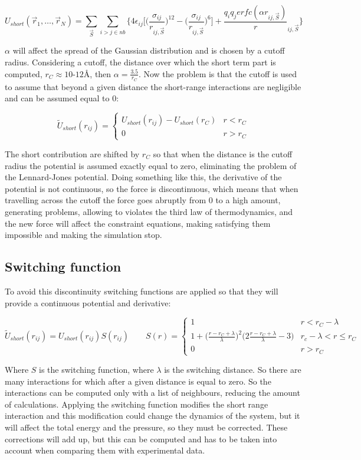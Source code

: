 $$U_{short}(\vec{r}_1, \dots, \vec{r}_N) = \sum\limits_{\vec{S}}\sum\limits_{i>j\in nb}\biggl\{4\epsilon_{ij}\biggl[\biggl(\frac{\sigma_{ij}}{r_{ij, \vec{S}}}\biggr)^{12} - \biggl(\frac{\sigma_{ij}}{r_{ij, \vec{S}}}\biggr)^{6}\biggr] + \frac{q_iq_jerfc(\alpha r_{ij, \vec{S}})}r_{ij, \vec{S}}\biggr\}$$


$\alpha$ will affect the spread of the Gaussian distribution and is chosen by a cutoff radius.
Considering a cutoff, the distance over which the short term part is computed, $r_C\approx 10$-$12\si{\angstrom}$, then $\alpha = \frac{3.5}{r_C}$.
Now the problem is that the cutoff is used to assume that beyond a given distance the short-range interactions are negligible and can be assumed equal to $0$:

$$\tilde{U}_{short}(r_{ij}) = \begin{cases} U_{short}(r_{ij}) - U_{short}(r_C) & r<r_C\\ 0 & r>r_C\end{cases}$$

The short contribution are shifted by $r_C$ so that when the distance is the cutoff radius the potential is assumed exactly equal to zero, eliminating the problem of the Lennard-Jones potential.
Doing something like this, the derivative of the potential is not continuous, so the force is discontinuous, which means that when travelling across the cutoff the force goes abruptly from $0$ to a high amount, generating problems, allowing to violates the third law of thermodynamics, and the new force will affect the constraint equations, making satisfying them impossible and making the simulation stop.

	\subsection{Switching function}
	To avoid this discontinuity switching functions are applied so that they will provide a continuous potential and derivative:

	$$\tilde{U}_{short}(r_{ij}) = U_{short}(r_{ij})S(r_{ij})\qquad S(r) = \begin{cases} 1 & r<r_C-\lambda\\ 1 + \biggl(\frac{r-r_C+\lambda}{\lambda}\biggr)^2\biggl(2\frac{r-r_C + \lambda}{\lambda} - 3\biggr) & r_c -\lambda < r\le r_C\\0 & r> r_C\end{cases}$$

	Where $S$ is the switching function, where $\lambda$ is the switching distance.
	So there are many interactions for which after a given distance is equal to zero.
	So the interactions can be computed only with a list of neighbours, reducing the amount of calculations.
	Applying the switching function modifies the short range interaction and this modification could change the dynamics of the system, but it will affect the total energy and the pressure, so they must be corrected.
	These corrections will add up, but this can be computed and has to be taken into account when comparing them with experimental data.

